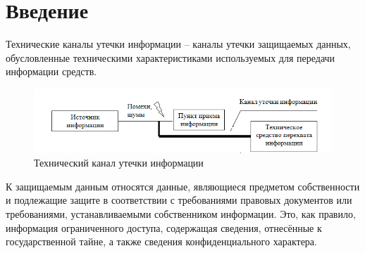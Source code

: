 \section*{Введение}

Технические каналы утечки информации – каналы утечки защищаемых данных, обусловленные техническими характеристиками используемых для передачи информации средств.

\begin{figure}[H]
	\centering
	\includegraphics[width=0.7\linewidth]{"img/Tcoibl6_1"}
	\caption{Технический канал утечки информации}
\end{figure}


К защищаемым данным относятся данные, являющиеся предметом собственности и подлежащие защите в соответствии с требованиями правовых документов или требованиями, устанавливаемыми собственником информации. Это, как правило, информация ограниченного доступа, содержащая сведения, отнесённые к государственной тайне, а также сведения конфиденциального характера.

